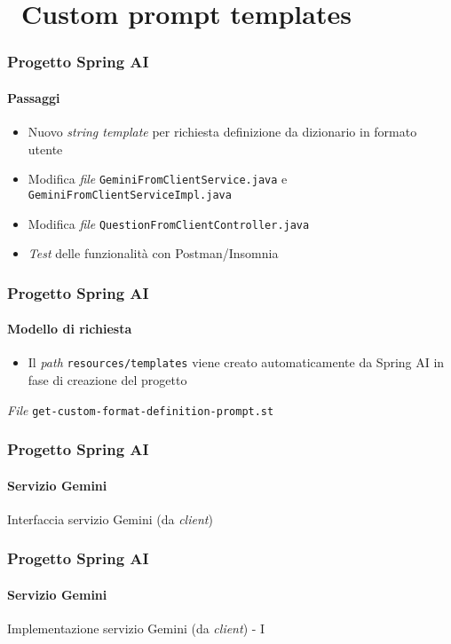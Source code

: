 \section{\faWrench\ Custom prompt templates} %
\label{sec:spring-ai-gemini-custom-format-prompt-templates}
%
\begin{frame}[t,fragile] \frametitle{Progetto Spring AI}
    \framesubtitle{Passaggi}
	\begin{itemize}[leftmargin=10pt,align=right]
		\item[\alertedcircled{1}] Nuovo \textit{string template} per richiesta definizione da dizionario in formato utente
        \item[\alertedcircled{2}] Modifica \textit{file} \texttt{GeminiFromClientService.java} e \texttt{GeminiFromClientServiceImpl.java}
        \item[\alertedcircled{3}] Modifica \textit{file} \texttt{QuestionFromClientController.java}
        \item[\alertedcircled{4}] \textit{Test} delle funzionalità con Postman/Insomnia
	\end{itemize}
\end{frame}
%
\begin{frame}[t,fragile] \frametitle{Progetto Spring AI}
    \framesubtitle{Modello di richiesta}
        \begin{itemize}[leftmargin=10pt,align=right]
		    \item[\alert{\faExclamationTriangle}] Il \textit{path} \texttt{resources/templates} viene creato automaticamente da Spring AI in fase di creazione del progetto
        \end{itemize}
        \begin{block}{\textit{File} \texttt{get-custom-format-definition-prompt.st}}
			{\scriptsize}
    	\end{block}
\end{frame}
%
\begin{frame}[t,fragile] \frametitle{Progetto Spring AI}
    \framesubtitle{Servizio Gemini}
        \begin{block}{Interfaccia servizio Gemini (da \textit{client})}
{\tiny}
    \end{block}
\end{frame}
%
\begin{frame}[t,fragile] \frametitle{Progetto Spring AI}
    \framesubtitle{Servizio Gemini}
		\vspace*{-.7cm}
        \begin{block}{Implementazione servizio Gemini (da \textit{client}) - I}
{\tiny}
    \end{block}
\end{frame}
